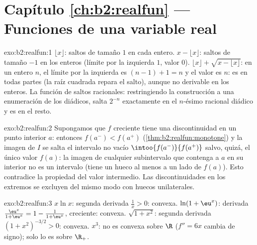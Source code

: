 \section*{Capítulo \ref{ch:b2:realfun} --- Funciones de una variable real}

\begin{solution}{exo:b2:realfun:1}
$\lfloor x\rfloor$: saltos de tamaño $1$ en cada entero. $x -
\lfloor x\rfloor$: saltos de tamaño $-1$ en los enteros (límite por
la izquierda $1$, valor $0$). $\lfloor x\rfloor + \sqrt{x - \lfloor
x\rfloor}$: en un entero $n$, el límite por la izquierda es $(n - 1)
+ 1 = n$ y el valor es $n$: es \emph{} en todas partes (la
raíz cuadrada repara el salto), aunque no derivable en los enteros.
La función de saltos racionales: restringiendo la construcción a una
enumeración de los diádicos, salta $2^{-n}$ exactamente en el
$n$-ésimo racional diádico y es  en el resto.
\end{solution}

\begin{solution}{exo:b2:realfun:2}
Supongamos que $f$ creciente tiene una discontinuidad en un punto
interior $a$: entonces $f(a^-) < f(a^+)$
(\cref{thm:b2:realfun:monotone}) y la imagen de $I$ se salta el
intervalo  no vacío $\intoo{f(a^-)}{f(a^+)}$ salvo, quizá, el
único valor $f(a)$: la imagen de cualquier subintervalo que contenga
a $a$ en su interior no es un intervalo (tiene un hueco al menos a
un lado de $f(a)$). Esto contradice la propiedad del valor
intermedio. Las discontinuidades en los extremos se excluyen del
mismo modo con huecos unilaterales.
\end{solution}

\begin{solution}{exo:b2:realfun:3}
$x\ln x$: segunda derivada $\frac1x > 0$: convexa. $\ln(1 +
\eu^x)$: derivada $\frac{\eu^x}{1 + \eu^x} = 1 - \frac{1}{1 +
\eu^x}$, creciente: convexa. $\sqrt{1 + x^2}$: segunda derivada $(1
+ x^2)^{-3/2} > 0$: convexa. $x^3$: no es convexa sobre $\R$ ($f'' =
6x$ cambia de signo); solo lo es sobre $\R_+$.
\end{solution}


